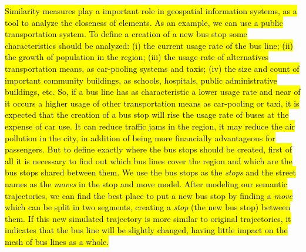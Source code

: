\documentclass[12pt]{article}
\begin{document}
\hl{Similarity measures play a important role in geospatial information systems, as a tool to analyze the closeness of elements. As an example, we can use a public transportation system. To define a creation of a new bus stop some characteristics should be analyzed: (i) the current usage rate of the bus line; (ii) the growth of population in the region; (iii) the usage rate of alternatives transportation means, as car-pooling systems and taxis; (iv) the size and count of important community buildings, as schools, hospitals, public administrative buildings, etc. So, if a bus line has as characteristic a lower usage rate and near of it occurs a higher usage of other transportation means as car-pooling or taxi, it is expected that the creation of a bus stop will rise the usage rate of buses at the expense of car use. It can reduce traffic jams in the region, it may reduce the air pollution in the city, in addition of being more financially advantageous for passengers. But to define exactly where the bus stops should be created, first of all it is necessary to find out which bus lines cover the region and which are the bus stops shared between them. We use the bus stops as the \emph{stops} and the street names as the \emph{moves} in the stop and move model. After modeling our semantic trajectories, we can find the best place to put a new bus stop by finding a \emph{move} which can be split in two segments, creating a \emph{stop} (the new bus stop) between them. If this new simulated trajectory is more similar to original trajectories, it indicates that the bus line will be slightly changed, having little impact on the mesh of bus lines as a whole.}
\end{document}
